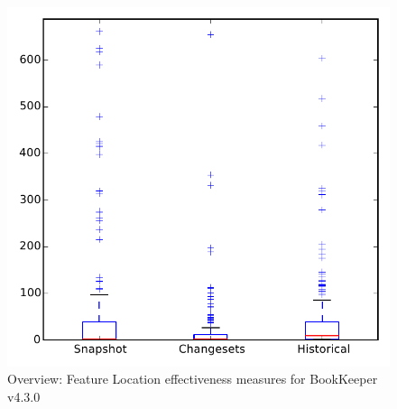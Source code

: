 
\begin{figure}
\centering
\includegraphics[height=0.4\textheight]{figures/flt/all_bookkeeper}
\caption{Overview: Feature Location effectiveness measures for BookKeeper v4.3.0}
\label{fig:flt:all:bookkeeper}
\end{figure}
